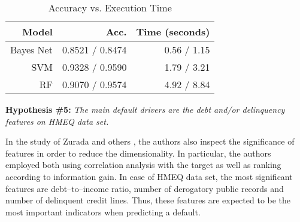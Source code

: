 \begin{table}[H]
    \small
    \setlength{\tabcolsep}{8pt}
    \renewcommand{\arraystretch}{1.3}
    \centering
    \caption[Accuracy vs. Execution Time \citep{wu2018accurate}]{Accuracy vs. Execution Time \citep{wu2018accurate}}\label{tab:wuexec}
    \begin{tabular}{r r r}
    \toprule
    Model & Acc. & Time (seconds) \\
    \midrule
    \hline
    Bayes Net & 0.8521 / 0.8474 & 0.56 / 1.15 \\
    SVM & 0.9328 / 0.9590 & 1.79 / 3.21 \\
    RF & 0.9070 / 0.9574 & 4.92 / 8.84 \\

    \hline
    \bottomrule
    \end{tabular}
    \vspace{0.35em}
    
    \vspace{-1em}
\end{table}

\vspace{0.3cm}

\noindent \textbf{Hypothesis \#5:} \textit{The main default drivers are the debt and/or delinquency features on HMEQ data set.}

In the study of Zurada and others \citep{zurada2014classification}, the authors also inspect the significance of features in order to reduce the dimensionality. In particular, the authors employed both using correlation analysis with the target as well as ranking according to information gain.
In case of HMEQ data set, the most significant features are debt--to--income ratio, number of derogatory public records and number of delinquent credit lines.
Thus, these features are expected to be the most important indicators when predicting a default.